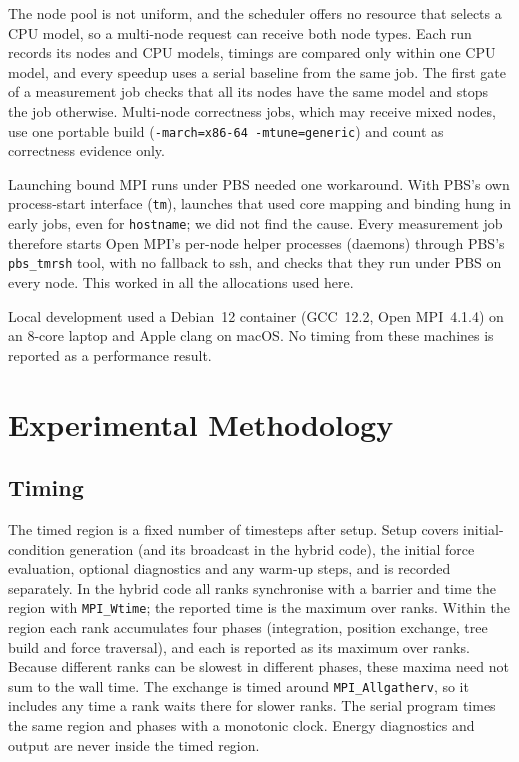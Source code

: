 \documentclass[10pt,a4paper,twocolumn,twoside]{rho-class/rho}
\begin{document}
The node pool is not uniform, and the scheduler offers no resource that selects a CPU model, so a multi-node request can receive both node types. Each run records its nodes and CPU models, timings are compared only within one CPU model, and every speedup uses a serial baseline from the same job. The first gate of a measurement job checks that all its nodes have the same model and stops the job otherwise. Multi-node correctness jobs, which may receive mixed nodes, use one portable build (\texttt{-march=x86-64 -mtune=generic}) and count as correctness evidence only.

Launching bound MPI runs under PBS needed one workaround. With PBS's own process-start interface (\texttt{tm}), launches that used core mapping and binding hung in early jobs, even for \texttt{hostname}; we did not find the cause. Every measurement job therefore starts Open MPI's per-node helper processes (daemons) through PBS's \texttt{pbs\_tmrsh} tool, with no fallback to ssh, and checks that they run under PBS on every node. This worked in all the allocations used here.

Local development used a Debian~12 container (GCC~12.2, Open MPI~4.1.4) on an 8-core laptop and Apple clang on macOS. No timing from these machines is reported as a performance result.

\section{Experimental Methodology}
\label{sec:methodology}
\subsection{Timing}
The timed region is a fixed number of timesteps after setup. Setup covers initial-condition generation (and its broadcast in the hybrid code), the initial force evaluation, optional diagnostics and any warm-up steps, and is recorded separately. In the hybrid code all ranks synchronise with a barrier and time the region with \texttt{MPI\_Wtime}; the reported time is the maximum over ranks. Within the region each rank accumulates four phases (integration, position exchange, tree build and force traversal), and each is reported as its maximum over ranks. Because different ranks can be slowest in different phases, these maxima need not sum to the wall time. The exchange is timed around \texttt{MPI\_Allgatherv}, so it includes any time a rank waits there for slower ranks. The serial program times the same region and phases with a monotonic clock. Energy diagnostics and output are never inside the timed region.
\end{document}
